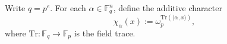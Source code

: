 \begin{definition}
\label{def:ff-additive-characters}
\leanok
Write $q = p^e$. For each $\alpha \in \mathbb{F}_q^n$, define
  the additive character
  \[
    \chi_\alpha(x) := \omega_p^{\mathrm{Tr}(\langle \alpha, x\rangle)},
  \]
  where $\mathrm{Tr} : \mathbb{F}_q \to \mathbb{F}_p$ is the field trace.
\end{definition}
